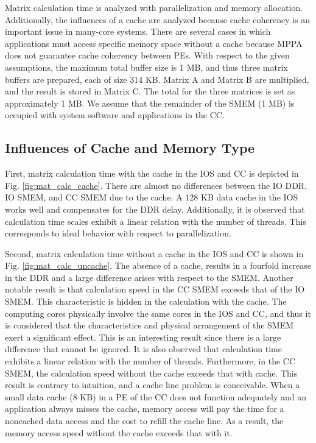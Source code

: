 Matrix calculation time is analyzed with parallelization and memory allocation.
Additionally, the influences of a cache are analyzed because cache coherency is an important issue in many-core systems.
There are several cases in which applications must access specific memory space without a cache because MPPA does not guarantee cache coherency between PEs.
With respect to the given assumptions, the maximum total buffer size is 1 MB, and thus three matrix buffers are prepared, each of size 314 KB.
Matrix A and Matrix B are multiplied, and the result is stored in Matrix C.
The total for the three matrices is set as approximately 1 MB.
We assume that the remainder of the SMEM (1 MB) is occupied with system software and applications in the CC.

\subsection{Influences of Cache and Memory Type}
\label{sec:cache_and_memory}
First, matrix calculation time with the cache in the IOS and CC is depicted in Fig. \ref{fig:mat_calc_cache}.
There are almost no differences between the IO DDR, IO SMEM, and CC SMEM due to the cache.
A 128 KB data cache in the IOS works well and compensates for the DDR delay.
Additionally, it is observed that calculation time scales exhibit a linear relation with the number of threads.
This corresponds to ideal behavior with respect to parallelization.

Second, matrix calculation time without a cache in the IOS and CC is shown in Fig. \ref{fig:mat_calc_uncache}.
The absence of a cache, results in a fourfold increase in the DDR and a large difference arises with respect to the SMEM.
Another notable result is that calculation speed in the CC SMEM exceeds that of the IO SMEM.
This characteristic is hidden in the calculation with the cache.
The computing cores physically involve the same cores in the IOS and CC, and thus it is considered that the characteristics and physical arrangement of the SMEM exert a significant effect.
This is an interesting result since there is a large difference that cannot be ignored.
It is also observed that calculation time exhibits a linear relation with the number of threads.
Furthermore, in the CC SMEM, the calculation speed without the cache exceeds that with cache.
This result is contrary to intuition, and a cache line problem is conceivable.
When a small data cache (8 KB) in a PE of the CC does not function adequately and an application always misses the cache, memory access will pay the time for a noncached data access and the cost to refill the cache line.
As a result, the memory access speed without the cache exceeds that with it.

